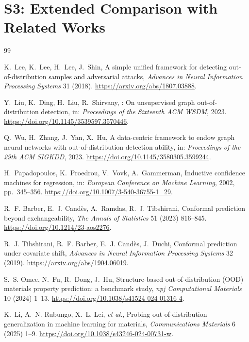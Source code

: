 \documentclass[preprint,12pt]{elsarticle}
\newcommand{\etal}{\textit{et al.}}
\begin{document}
\section*{S3: Extended Comparison with Related Works}
\label{supp:s3}
\begin{thebibliography}{99}

K.~Lee, K.~Lee, H.~Lee, J.~Shin,
\newblock A simple unified framework for detecting out-of-distribution samples and adversarial attacks,
\newblock \textit{Advances in Neural Information Processing Systems} 31 (2018).
\newblock \url{https://arxiv.org/abs/1807.03888}.

Y.~Liu, K.~Ding, H.~Liu, R.~Shirvany,
: On unsupervised graph out-of-distribution detection,
\newblock in: \textit{Proceedings of the Sixteenth ACM WSDM}, 2023.
\newblock \url{https://doi.org/10.1145/3539597.3570446}.

Q.~Wu, H.~Zhang, J.~Yan, X.~Hu,
\newblock A data-centric framework to endow graph neural networks with out-of-distribution
  detection ability,
\newblock in: \textit{Proceedings of the 29th ACM SIGKDD}, 2023.
\newblock \url{https://doi.org/10.1145/3580305.3599244}.

H.~Papadopoulos, K.~Proedrou, V.~Vovk, A.~Gammerman,
\newblock Inductive confidence machines for regression,
\newblock in: \textit{European Conference on Machine Learning}, 2002, pp.~345--356.
\newblock \url{https://doi.org/10.1007/3-540-36755-1_29}.

R.~F. Barber, E.~J. Cand\`{e}s, A.~Ramdas, R.~J. Tibshirani,
\newblock Conformal prediction beyond exchangeability,
\newblock \textit{The Annals of Statistics} 51 (2023) 816--845.
\newblock \url{https://doi.org/10.1214/23-aos2276}.

R.~J. Tibshirani, R.~F. Barber, E.~J. Cand\`{e}s, J.~Duchi,
\newblock Conformal prediction under covariate shift,
\newblock \textit{Advances in Neural Information Processing Systems} 32 (2019).
\newblock \url{https://arxiv.org/abs/1904.06019}.

S.~S. Omee, N.~Fu, R.~Dong, J.~Hu,
\newblock Structure-based out-of-distribution ({OOD}) materials property prediction:
  a benchmark study,
\newblock \textit{npj Computational Materials} 10 (2024) 1--13.
\newblock \url{https://doi.org/10.1038/s41524-024-01316-4}.

K.~Li, A.~N. Rubungo, X.~L. Lei, \etal,
\newblock Probing out-of-distribution generalization in machine learning for materials,
\newblock \textit{Communications Materials} 6 (2025) 1--9.
\newblock \url{https://doi.org/10.1038/s43246-024-00731-w}.


\end{thebibliography}
\end{document}
